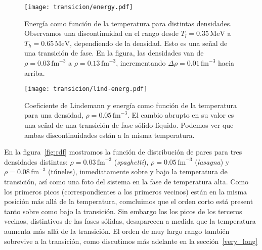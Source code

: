 \begin{figure}[h!]  \centering
\texttt{[image: transicion/energy.pdf]}
\caption{Energía como función de la temperatura para distintas densidades.
  Observamos una discontinuidad en el rango desde $T_l=0.35\,\text{MeV}$ a $T_h=0.65\,\text{MeV}$, dependiendo de la densidad.
  Esto es una señal de una transición de fase.
  En la figura, las densidades van de $\rho=0.03\,\text{fm}^{-3}$ a $\rho=0.13\,\text{fm}^{-3}$, incrementando $\Delta\rho=0.01\,\text{fm}^{-3}$ hacia arriba.}
\label{fig:energy}
\end{figure}

\begin{figure}[h!]  \centering
\texttt{[image: transicion/lind-energ.pdf]}
\caption{Coeficiente de Lindemann y energía como función de la temperatura para una densidad, $\rho=0.05\,\text{fm}^{-3}$.
  El cambio abrupto en su valor es una señal de una transición de fase sólido-líquido.
  Podemos ver que ambas discontinuidades están a la misma temperatura.}
\label{fig:lind-energ}
\end{figure}

En la figura~\ref{fig:rdf} mostramos la función de distribución de pares para tres densidades distintas: $\rho=0.03\,\text{fm}^{-3}$ (\emph{spaghetti}), $\rho=0.05\,\text{fm}^{-3}$ (\emph{lasagna}) y $\rho=0.08\,\text{fm}^{-3}$ (túneles), inmediatamente sobre y bajo la temperatura de transición, así como una foto del sistema en la fase de temperatura alta.
Como los primeros picos (correspondientes a los primeros vecinos) están en la misma posición más allá de la temperatura, comcluimos que el orden corto está present tanto sobre como bajo la transición.
Sin embargo los los picos de los terceros vecinos, distintivos de las fases sólidas, desaparecen a medida que la temperatura aumenta más allá de la transición.
El orden de muy largo rango también sobrevive a la transición, como discutimos más adelante en la sección~\ref{very_long}

